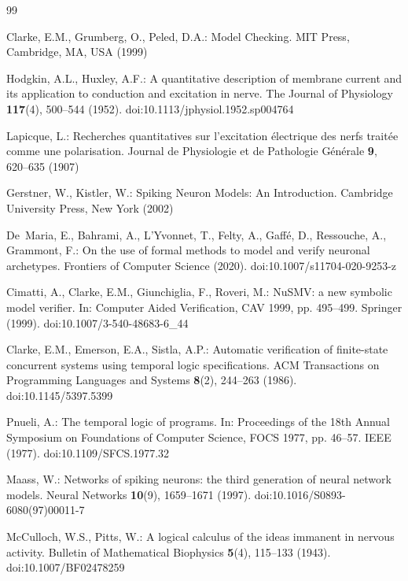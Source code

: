 \documentclass[
]{ceurart}
\begin{document}
\begin{thebibliography}{99}

Clarke, E.M., Grumberg, O., Peled, D.A.: Model Checking. MIT Press,
Cambridge, MA, USA (1999)

Hodgkin, A.L., Huxley, A.F.: A quantitative description of membrane
current and its application to conduction and excitation in nerve.
The Journal of Physiology \textbf{117}(4), 500--544 (1952).
doi:10.1113/jphysiol.1952.sp004764

Lapicque, L.: Recherches quantitatives sur l'excitation
\'{e}lectrique des nerfs trait\'{e}e comme une polarisation. Journal
de Physiologie et de Pathologie G\'{e}n\'{e}rale \textbf{9},
620--635 (1907)

Gerstner, W., Kistler, W.: Spiking Neuron Models: An Introduction.
Cambridge University Press, New York (2002)

De~Maria, E., Bahrami, A., L'Yvonnet, T., Felty, A., Gaff\'{e}, D.,
Ressouche, A., Grammont, F.: On the use of formal methods to model
and verify neuronal archetypes. Frontiers of Computer Science
(2020).
doi:10.1007/s11704-020-9253-z

Cimatti, A., Clarke, E.M., Giunchiglia, F., Roveri, M.: NuSMV: a
new symbolic model verifier. In: Computer Aided Verification,
CAV 1999, pp. 495--499. Springer (1999).
doi:10.1007/3-540-48683-6\_44

Clarke, E.M., Emerson, E.A., Sistla, A.P.: Automatic verification
of finite-state concurrent systems using temporal logic
specifications. ACM Transactions on Programming Languages and
Systems \textbf{8}(2), 244--263 (1986).
doi:10.1145/5397.5399

Pnueli, A.: The temporal logic of programs. In: Proceedings of
the 18th Annual Symposium on Foundations of Computer Science,
FOCS 1977, pp. 46--57. IEEE (1977).
doi:10.1109/SFCS.1977.32

Maass, W.: Networks of spiking neurons: the third generation of
neural network models. Neural Networks \textbf{10}(9), 1659--1671
(1997).
doi:10.1016/S0893-6080(97)00011-7

McCulloch, W.S., Pitts, W.: A logical calculus of the ideas
immanent in nervous activity. Bulletin of Mathematical Biophysics
\textbf{5}(4), 115--133 (1943).
doi:10.1007/BF02478259


\end{thebibliography}
\end{document}
